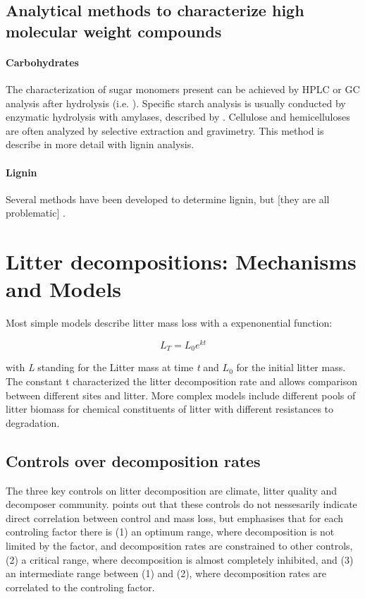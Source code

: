 \subsection{Analytical methods to characterize high molecular weight compounds}

\paragraph{Carbohydrates}
The characterization of sugar monomers present can be achieved by HPLC or GC analysis after hydrolysis (i.e. \cite{Snajdr2011}). Specific starch analysis is usually conducted by enzymatic hydrolysis with amylases, described by \cite{Leitner2011}. Cellulose and hemicelluloses are  often analyzed by selective extraction and gravimetry. This method is describe in more detail with lignin analysis.

\paragraph{Lignin}
Several methods have been developed to determine lignin, but [they are all problematic] \citep{Hatfield2005}.





\section{Litter decompositions: Mechanisms and Models}
 Most simple models describe litter mass loss with a expenonential function:

\begin{equation}
L_T=L_0e^{kt}
\end{equation}

with \emph{L} standing for the Litter mass at time \emph{t} and $L_0$ for the initial litter mass. The constant t characterized the litter decomposition rate \citep[p.157]{Chapin2002} and allows comparison between different sites and litter. More complex models include different pools of litter biomass for chemical constituents of litter with different resistances to degradation. 

\subsection{Controls over decomposition rates}
\label{decomp_controls}

The three key controls on litter decomposition are climate, litter quality and decomposer community. \cite{Prescott2010} points out that these controls do not nessesarily indicate direct correlation between control and mass loss, but emphasises that for each controling factor there is (1) an optimum range, where decomposition is not limited by the factor, and decomposition rates are constrained to other controls, (2) a critical range, where decomposition is almost completely inhibited, and (3) an intermediate range between (1) and (2), where decomposition rates are correlated to the controling factor. 

